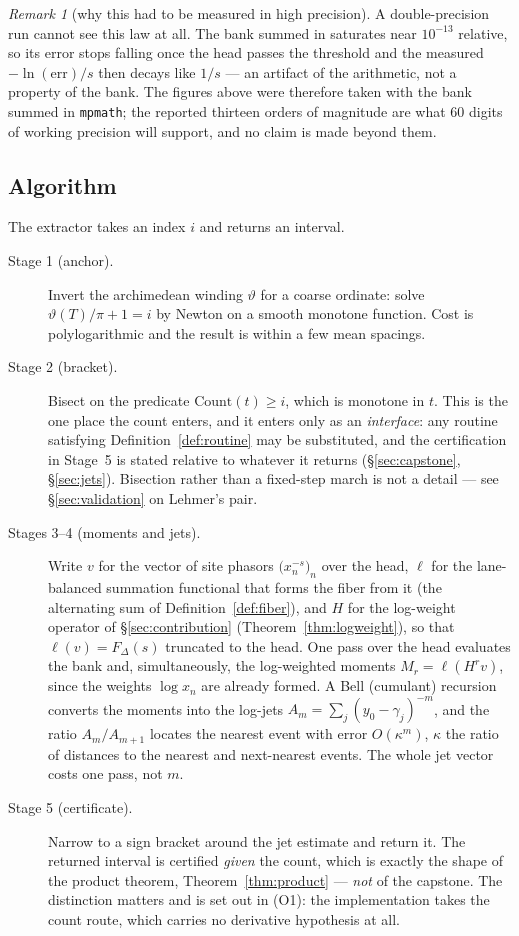 \documentclass[11pt]{article}
\theoremstyle{plain}
\theoremstyle{definition}
\theoremstyle{remark}
\newtheorem{remark}[theorem]{Remark}
\newcommand{\lean}[1]{\texttt{\detokenize{#1}}}
\begin{document}
\begin{remark}[why this had to be measured in high precision]
A double-precision run cannot see this law at all. The bank summed in \lean{float64}
saturates near $10^{-13}$ relative, so its error stops falling once the head passes the
threshold and the measured $-\ln(\mathrm{err})/s$ then decays like $1/s$ --- an artifact
of the arithmetic, not a property of the bank. The figures above were therefore taken
with the bank summed in \texttt{mpmath}; the reported thirteen orders of magnitude are
what $60$ digits of working precision will support, and no claim is made beyond them.
\end{remark}

\subsection{Algorithm}
The extractor takes an index $i$ and returns an interval.

\begin{description}
\item[Stage 1 (anchor).] Invert the archimedean winding $\vartheta$ for a coarse
  ordinate: solve $\vartheta(T)/\pi+1=i$ by Newton on a smooth monotone function. Cost
  is polylogarithmic and the result is within a few mean spacings.
\item[Stage 2 (bracket).] Bisect on the predicate $\mathrm{Count}(t)\ge i$, which is
  monotone in $t$. This is the one place the count enters, and it enters only as an
  \emph{interface}: any routine satisfying Definition~\ref{def:routine} may be
  substituted, and the certification in Stage~5 is stated relative to whatever it
  returns (\S\ref{sec:capstone}, \S\ref{sec:jets}). Bisection rather than a fixed-step
  march is not a detail --- see \S\ref{sec:validation} on Lehmer's pair.
\item[Stages 3--4 (moments and jets).] Write $v$ for the vector of site phasors
  $\bigl(x_n^{-s}\bigr)_n$ over the head, $\ell$ for the lane-balanced summation
  functional that forms the fiber from it (the alternating sum of
  Definition~\ref{def:fiber}), and $H$ for the log-weight operator of
  \S\ref{sec:contribution} (Theorem~\ref{thm:logweight}), so that $\ell(v)=F_\Delta(s)$
  truncated to the head. One
  pass over the head evaluates the bank and, simultaneously, the log-weighted moments
  $M_r=\ell(H^r v)$, since the weights $\log x_n$ are already formed. A Bell (cumulant) recursion converts the moments into
  the log-jets $A_m=\sum_j(y_0-\gamma_j)^{-m}$, and the ratio $A_m/A_{m+1}$ locates the
  nearest event with error $O(\kappa^m)$, $\kappa$ the ratio of distances to the
  nearest and next-nearest events. The whole jet vector costs one pass, not $m$.
\item[Stage 5 (certificate).] Narrow to a sign bracket around the jet estimate and
  return it. The returned interval is certified \emph{given} the count, which is
  exactly the shape of the product theorem, Theorem~\ref{thm:product} --- \emph{not}
  of the capstone. The distinction matters and is set out in (O1): the implementation
  takes the count route, which carries no derivative hypothesis at all.
\end{description}
\end{document}
